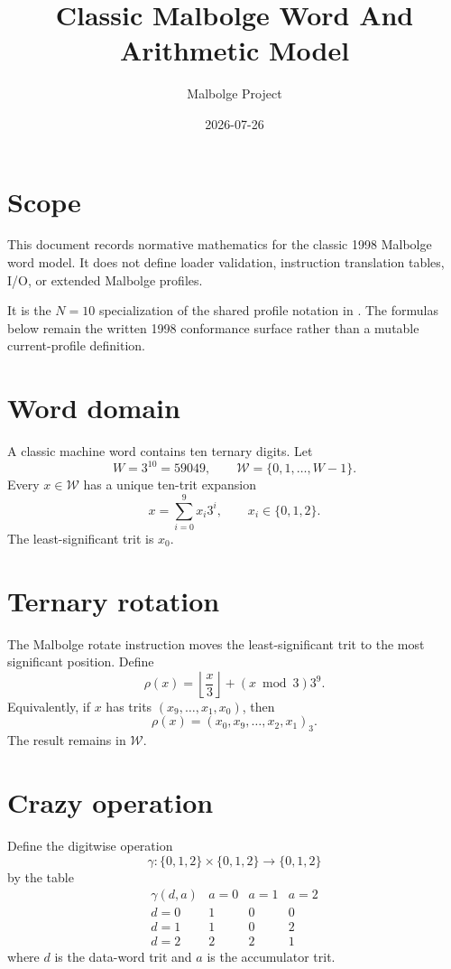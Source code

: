 \documentclass{article}
\title{Classic Malbolge Word And Arithmetic Model}
\author{Malbolge Project}
\date{2026{-}07{-}26}
\begin{document}
\maketitle

\section{Scope}

This document records normative mathematics for the classic 1998 Malbolge word
model. It does not define loader validation, instruction translation tables,
I/O, or extended Malbolge profiles.

It is the $N=10$ specialization of the shared profile notation in
. The formulas below remain the written 1998 conformance
surface rather than a mutable current-profile definition.

\section{Word domain}

A classic machine word contains ten ternary digits. Let
\begin{equation}
  W = 3^{10} = 59049,
  \qquad
  \mathcal{W} = \{0,1,\ldots,W-1\}.
  \label{eq:classic-word-domain}
\end{equation}
Every $x\in\mathcal{W}$ has a unique ten-trit expansion
\[
  x = \sum_{i=0}^{9} x_i 3^i,
  \qquad
  x_i\in\{0,1,2\}.
\]
The least-significant trit is $x_0$.

\section{Ternary rotation}

The Malbolge rotate instruction moves the least-significant trit to the most
significant position. Define
\begin{equation}
  \rho(x)
    = \left\lfloor\frac{x}{3}\right\rfloor
      + (x\bmod 3)3^9.
  \label{eq:classic-rotate}
\end{equation}
Equivalently, if $x$ has trits $(x_9,\ldots,x_1,x_0)$, then
\[
  \rho(x) = (x_0,x_9,\ldots,x_2,x_1)_3.
\]
The result remains in $\mathcal{W}$.

\section{Crazy operation}

Define the digitwise operation
\[
  \gamma : \{0,1,2\}\times\{0,1,2\}\to\{0,1,2\}
\]
by the table
\[
\begin{array}{c|ccc}
\gamma(d,a) & a=0 & a=1 & a=2 \\
\hline
 d=0 & 1 & 0 & 0 \\
 d=1 & 1 & 0 & 2 \\
 d=2 & 2 & 2 & 1
\end{array}
\]
where $d$ is the data-word trit and $a$ is the accumulator trit.
\end{document}
